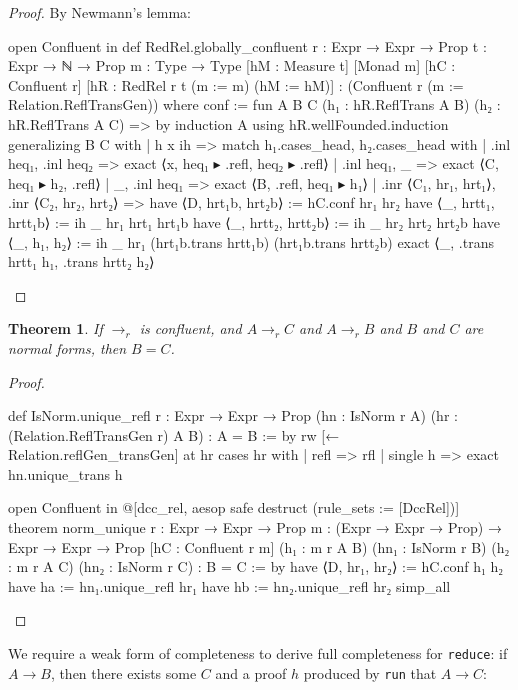 \documentclass{article}
\newtheorem{theorem}{Theorem}
\begin{document}
\begin{proof}
  By Newmann's lemma:

\begin{leancode}
open Confluent in def RedRel.globally_confluent
  {r : Expr → Expr → Prop} {t : Expr → ℕ → Prop} {m : Type → Type}
  [hM : Measure t] [Monad m] [hC : Confluent r]
  [hR : RedRel r t (m := m) (hM := hM)] : (Confluent r (m := Relation.ReflTransGen)) where
  conf := fun {A B C} (h₁ : hR.ReflTrans A B) (h₂ : hR.ReflTrans A C) => by
    induction A using hR.wellFounded.induction generalizing B C with
    | h x ih =>
      match h₁.cases_head, h₂.cases_head with
      | .inl heq₁, .inl heq₂ =>
        exact ⟨x, heq₁ ▸ .refl, heq₂ ▸ .refl⟩
      | .inl heq₁, _ =>
        exact ⟨C, heq₁ ▸ h₂, .refl⟩
      | _, .inl heq₁ =>
        exact ⟨B, .refl, heq₁ ▸ h₁⟩
      | .inr ⟨C₁, hr₁, hrt₁⟩, .inr ⟨C₂, hr₂, hrt₂⟩ =>
        have ⟨D, hrt₁b, hrt₂b⟩ := hC.conf hr₁ hr₂
        have ⟨_, hrtt₁, hrtt₁b⟩ := ih _ hr₁ hrt₁ hrt₁b
        have ⟨_, hrtt₂, hrtt₂b⟩ := ih _ hr₂ hrt₂ hrt₂b
        have ⟨_, h₁, h₂⟩ := ih _ hr₁ (hrt₁b.trans hrtt₁b) (hrt₁b.trans hrtt₂b)
        exact ⟨_, .trans hrtt₁ h₁, .trans hrtt₂ h₂⟩
\end{leancode}
\end{proof}

\begin{theorem}
  If \(\rightarrow_{r}\) is confluent, and \(A \rightarrow_{r} C\) and \(A \rightarrow_{r} B\) and \(B\) and \(C\) are normal forms, then \(B = C\).
\end{theorem}

\begin{proof}
\begin{leancode}


def IsNorm.unique_refl {r : Expr → Expr → Prop} (hn : IsNorm r A)
  (hr : (Relation.ReflTransGen r) A B) : A = B := by
  rw [← Relation.reflGen_transGen] at hr
  cases hr with
  | refl => rfl
  | single h => exact hn.unique_trans h

open Confluent in @[dcc_rel, aesop safe destruct (rule_sets := [DccRel])]
  theorem norm_unique {r : Expr → Expr → Prop} {m : (Expr → Expr → Prop) → Expr → Expr → Prop}
  [hC : Confluent r m] (h₁ : m r A B) (hn₁ : IsNorm r B) (h₂ : m r A C) (hn₂ : IsNorm r C) : B = C := by
  have ⟨D, hr₁, hr₂⟩ := hC.conf h₁ h₂
  have ha := hn₁.unique_refl hr₁
  have hb := hn₂.unique_refl hr₂
  simp_all
\end{leancode}
\end{proof}

We require a weak form of completeness to derive full completeness for \texttt{reduce}: if \(A \rightarrow B\), then there exists some \(C\) and a proof \(h\) produced by \texttt{run} that \(A \rightarrow C\):
\end{document}
